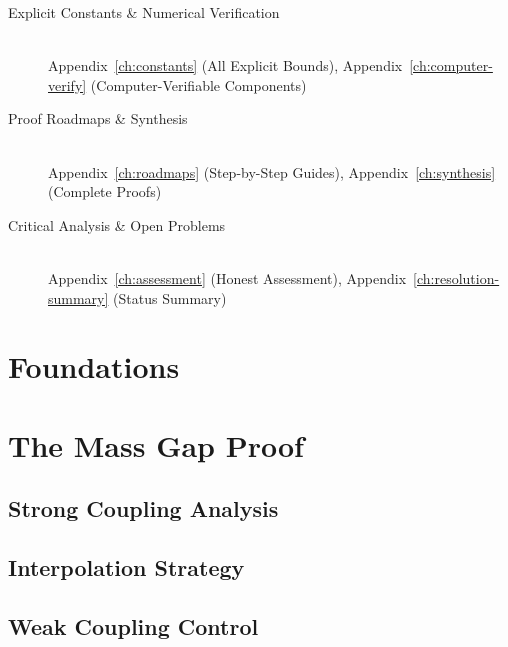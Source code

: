 \documentclass[11pt,a4paper]{report}
\begin{document}
\begin{description}
\item[Explicit Constants \& Numerical Verification] \hfill \\
  Appendix~\ref{ch:constants} (All Explicit Bounds),
  Appendix~\ref{ch:computer-verify} (Computer-Verifiable Components)

\item[Proof Roadmaps \& Synthesis] \hfill \\
  Appendix~\ref{ch:roadmaps} (Step-by-Step Guides),
  Appendix~\ref{ch:synthesis} (Complete Proofs)

\item[Critical Analysis \& Open Problems] \hfill \\
  Appendix~\ref{ch:assessment} (Honest Assessment),
  Appendix~\ref{ch:resolution-summary} (Status Summary)
\end{description}

\newpage

\part{Foundations}




\part{The Mass Gap Proof}

\chapter{Strong Coupling Analysis}


\chapter{Interpolation Strategy}


\chapter{Weak Coupling Control}

\end{document}
